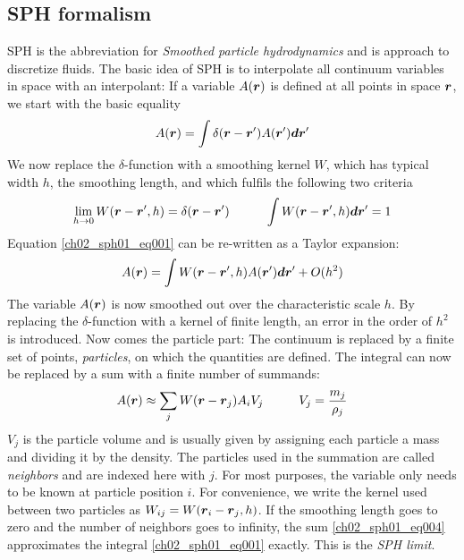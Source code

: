 \subsection{SPH formalism}
SPH is the abbreviation for \emph{Smoothed particle hydrodynamics} and is approach to discretize fluids. The basic idea of SPH is to interpolate all continuum variables in space with an interpolant: If a variable $A(\boldsymbol{r})$ is defined at all points in space $\boldsymbol{r}$, we start with the basic equality
\begin{equation}
\label{ch02_sph01_eq001}
A(\boldsymbol{r}) = \int  \delta(\boldsymbol{r} - \boldsymbol{r}') A(\boldsymbol{r}') \boldsymbol{d} \boldsymbol{r}'
\end{equation}
We now replace the $\delta$-function with a smoothing kernel $W$, which has typical width $h$, the smoothing length, and which fulfils the following two criteria
\begin{equation}
\label{ch02_sph01_eq002}
\lim_{h \to 0} W(\boldsymbol{r} - \boldsymbol{r}', h) = \delta(\boldsymbol{r} - \boldsymbol{r}') \hspace{1.0cm}
\int W(\boldsymbol{r} - \boldsymbol{r}', h) \boldsymbol{d} \boldsymbol{r}' = 1
\end{equation}
Equation \ref{ch02_sph01_eq001} can be re-written as a Taylor expansion:
\begin{equation}
\label{ch02_sph01_eq003}
A(\boldsymbol{r}) = \int  W(\boldsymbol{r} - \boldsymbol{r}', h) A(\boldsymbol{r}') \boldsymbol{d} \boldsymbol{r}' + O(h^2)
\end{equation}
The variable $A(\boldsymbol{r})$ is now smoothed out over the characteristic scale $h$. By replacing the $\delta$-function with a kernel of finite length, an error in the order of $h^2$ is introduced. Now comes the particle part: The continuum is replaced by a finite set of points, \emph{particles}, on which the quantities are defined. The integral can now be replaced by a sum with a finite number of summands:
\begin{equation}
\label{ch02_sph01_eq004}
A(\boldsymbol{r}) \approx \sum_{j} W(\boldsymbol{r} - \boldsymbol{r}_{j}) A_i V_{j} \hspace{1.0cm} V_{j} = \frac{m_j}{\rho_j}
\end{equation}
$V_{j}$ is the particle volume and is usually given by assigning each particle a mass and dividing it by the density. The particles used in the summation are called \emph{neighbors} and are indexed here with $j$. For most purposes, the variable only needs to be known at particle position $i$. For convenience, we write the kernel used between two particles as $W_{ij} = W( \boldsymbol{r}_{i} - \boldsymbol{r}_{j}, h)$. If the smoothing length goes to zero and the number of neighbors goes to infinity, the sum \ref{ch02_sph01_eq004} approximates the integral \ref{ch02_sph01_eq001} exactly. This is the \emph{SPH limit}.
